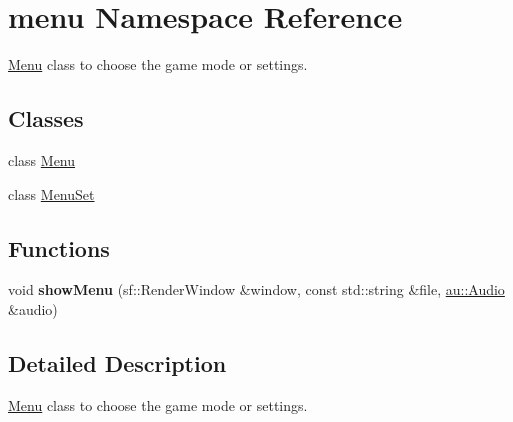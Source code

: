\hypertarget{namespacemenu}{}\section{menu Namespace Reference}
\label{namespacemenu}


\hyperlink{classmenu_1_1_menu}{Menu} class to choose the game mode or settings.  


\subsection*{Classes}
\begin{DoxyCompactItemize}
\item 
class \hyperlink{classmenu_1_1_menu}{Menu}
\item 
class \hyperlink{classmenu_1_1_menu_set}{Menu\+Set}
\end{DoxyCompactItemize}
\subsection*{Functions}
\begin{DoxyCompactItemize}
\item 
\mbox{\label{namespacemenu_abe245c26b8a3c516c4e74871dc15a87d}} 
void {\bfseries show\+Menu} (sf\+::\+Render\+Window \&window, const std\+::string \&file, \hyperlink{classau_1_1_audio}{au\+::\+Audio} \&audio)
\end{DoxyCompactItemize}


\subsection{Detailed Description}
\hyperlink{classmenu_1_1_menu}{Menu} class to choose the game mode or settings. 